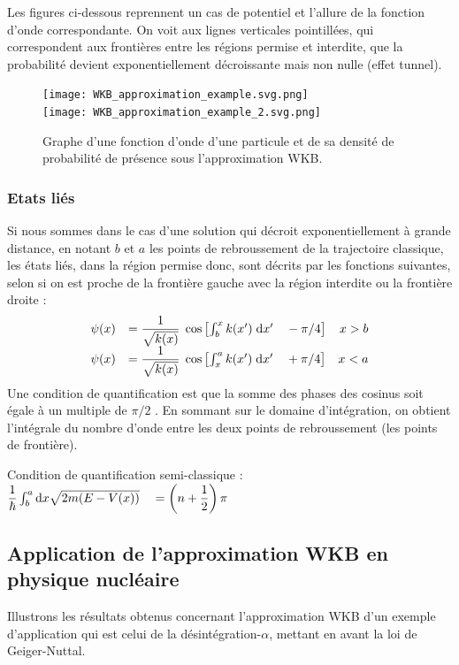 \documentclass[12pt, a4paper]{book}
\begin{document}
Les figures ci-dessous reprennent un cas de potentiel et l'allure de la fonction d'onde correspondante. On voit aux lignes verticales pointillées, qui correspondent aux frontières entre les régions permise et interdite, que la probabilité devient exponentiellement décroissante mais non nulle (effet tunnel).
\begin{figure}[h]
  \centering
  \texttt{[image: WKB\_approximation\_example.svg.png]} \\ \texttt{[image: WKB\_approximation\_example\_2.svg.png]}
  \caption{Graphe d'une fonction d'onde d'une particule et de sa densité de probabilité de présence sous l'approximation WKB.}
\end{figure}

\subsubsection{Etats liés}
Si nous sommes dans le cas d'une solution qui décroit exponentiellement à grande distance, en notant $b$ et $a$ les points de rebroussement de la trajectoire classique, les états liés, dans la région permise donc, sont décrits par les fonctions suivantes, selon si on est proche de la frontière gauche avec la région interdite ou la frontière droite :
\begin{equation}
  \begin{array}{llr}
    \psi(x) &= \dfrac{1}{\sqrt{k(x)}} \; \cos\left[\int_b ^x k(x')\; \mathrm{d} x' \quad - \pi/4\right] & x>b \\   
    \psi(x) &= \dfrac{1}{\sqrt{k(x)}} \; \cos\left[\int_x ^a k(x')\; \mathrm{d} x' \quad + \pi/4\right] & x<a    
  \end{array}
\end{equation}
Une condition de quantification est que la somme des phases des cosinus soit égale à un multiple de $\pi/2$ . En sommant sur le domaine d'intégration, on obtient l'intégrale du nombre d'onde entre les deux points de rebroussement (les points de frontière).
\begin{center}
  Condition de quantification semi-classique : $\dfrac{1}{\hbar} \int_b ^a \mathrm{d}x \sqrt{2m(E-V(x))} \quad = \left(n+\dfrac{1}{2}\right) \pi$
\end{center}

\subsection{Application de l'approximation WKB en physique nucléaire}
Illustrons les résultats obtenus concernant l'approximation WKB d'un exemple d'application qui est celui de la désintégration-$\alpha$,
mettant en avant la loi de Geiger-Nuttal. \\
\end{document}
